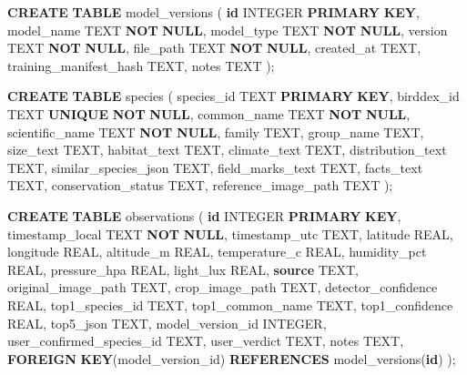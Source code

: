 \documentclass[
  11pt,
]{article}
\newenvironment{Shaded}{}{}
\newcommand{\DataTypeTok}[1]{\textcolor[rgb]{0.56,0.13,0.00}{#1}}
\newcommand{\KeywordTok}[1]{\textcolor[rgb]{0.00,0.44,0.13}{\textbf{#1}}}
\newcommand{\NormalTok}[1]{#1}
\begin{document}
\begin{Shaded}
\begin{Highlighting}[]
\KeywordTok{CREATE} \KeywordTok{TABLE}\NormalTok{ model\_versions (}
    \KeywordTok{id} \DataTypeTok{INTEGER} \KeywordTok{PRIMARY} \KeywordTok{KEY}\NormalTok{,}
\NormalTok{    model\_name TEXT }\KeywordTok{NOT} \KeywordTok{NULL}\NormalTok{,}
\NormalTok{    model\_type TEXT }\KeywordTok{NOT} \KeywordTok{NULL}\NormalTok{,}
\NormalTok{    version TEXT }\KeywordTok{NOT} \KeywordTok{NULL}\NormalTok{,}
\NormalTok{    file\_path TEXT }\KeywordTok{NOT} \KeywordTok{NULL}\NormalTok{,}
\NormalTok{    created\_at TEXT,}
\NormalTok{    training\_manifest\_hash TEXT,}
\NormalTok{    notes TEXT}
\NormalTok{);}

\KeywordTok{CREATE} \KeywordTok{TABLE}\NormalTok{ species (}
\NormalTok{    species\_id TEXT }\KeywordTok{PRIMARY} \KeywordTok{KEY}\NormalTok{,}
\NormalTok{    birddex\_id TEXT }\KeywordTok{UNIQUE} \KeywordTok{NOT} \KeywordTok{NULL}\NormalTok{,}
\NormalTok{    common\_name TEXT }\KeywordTok{NOT} \KeywordTok{NULL}\NormalTok{,}
\NormalTok{    scientific\_name TEXT }\KeywordTok{NOT} \KeywordTok{NULL}\NormalTok{,}
\NormalTok{    family TEXT,}
\NormalTok{    group\_name TEXT,}
\NormalTok{    size\_text TEXT,}
\NormalTok{    habitat\_text TEXT,}
\NormalTok{    climate\_text TEXT,}
\NormalTok{    distribution\_text TEXT,}
\NormalTok{    similar\_species\_json TEXT,}
\NormalTok{    field\_marks\_text TEXT,}
\NormalTok{    facts\_text TEXT,}
\NormalTok{    conservation\_status TEXT,}
\NormalTok{    reference\_image\_path TEXT}
\NormalTok{);}

\KeywordTok{CREATE} \KeywordTok{TABLE}\NormalTok{ observations (}
    \KeywordTok{id} \DataTypeTok{INTEGER} \KeywordTok{PRIMARY} \KeywordTok{KEY}\NormalTok{,}
\NormalTok{    timestamp\_local TEXT }\KeywordTok{NOT} \KeywordTok{NULL}\NormalTok{,}
\NormalTok{    timestamp\_utc TEXT,}
\NormalTok{    latitude }\DataTypeTok{REAL}\NormalTok{,}
\NormalTok{    longitude }\DataTypeTok{REAL}\NormalTok{,}
\NormalTok{    altitude\_m }\DataTypeTok{REAL}\NormalTok{,}
\NormalTok{    temperature\_c }\DataTypeTok{REAL}\NormalTok{,}
\NormalTok{    humidity\_pct }\DataTypeTok{REAL}\NormalTok{,}
\NormalTok{    pressure\_hpa }\DataTypeTok{REAL}\NormalTok{,}
\NormalTok{    light\_lux }\DataTypeTok{REAL}\NormalTok{,}
    \KeywordTok{source}\NormalTok{ TEXT,}
\NormalTok{    original\_image\_path TEXT,}
\NormalTok{    crop\_image\_path TEXT,}
\NormalTok{    detector\_confidence }\DataTypeTok{REAL}\NormalTok{,}
\NormalTok{    top1\_species\_id TEXT,}
\NormalTok{    top1\_common\_name TEXT,}
\NormalTok{    top1\_confidence }\DataTypeTok{REAL}\NormalTok{,}
\NormalTok{    top5\_json TEXT,}
\NormalTok{    model\_version\_id }\DataTypeTok{INTEGER}\NormalTok{,}
\NormalTok{    user\_confirmed\_species\_id TEXT,}
\NormalTok{    user\_verdict TEXT,}
\NormalTok{    notes TEXT,}
    \KeywordTok{FOREIGN} \KeywordTok{KEY}\NormalTok{(model\_version\_id) }\KeywordTok{REFERENCES}\NormalTok{ model\_versions(}\KeywordTok{id}\NormalTok{)}
\NormalTok{);}


\end{Highlighting}
\end{Shaded}
\end{document}
